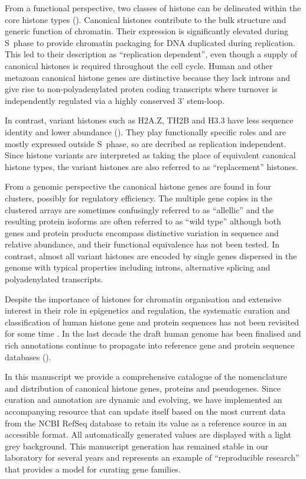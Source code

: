   From a functional perspective, two classes of histone can be delineated 
  within the core histone types (). 
  Canonical histones contribute to the bulk structure and generic function of chromatin. 
  Their expression is significantly elevated during S~phase to provide chromatin packaging 
  for DNA duplicated during replication. This led to their description as ``replication dependent'', 
  even though a supply of canonical histones is required throughout the cell cycle. 
  Human and other metazoan canonical histone genes are distinctive 
  because they lack introns and give rise to non-polyadenylated proten coding transcripts 
  where turnover is independently regulated via a highly conserved 3' stem-loop.
  
  In contrast, variant histones such as H2A.Z, TH2B and H3.3 have 
  less sequence identity and lower abundance (). 
  They play functionally specific roles and are mostly expressed outside S~phase, 
  so are decribed as replication independent. 
  Since histone variants are interpreted as taking the place of equivalent canonical histone types, 
  the variant histones are also referred to as ``replacement'' histones.
  
  From a genomic perspective the canonical histone genes are found in four clusters, possibly for regulatory efficiency. 
  The multiple gene copies in the clustered arrays are sometimes confusingly referred to as ``allellic'' 
  and the resulting protein isoforms are often referred to as ``wild type'' 
  although both genes and protein products encompass distinctive variation in sequence and relative abundance, 
  and their functional equivalence has not been tested.
  In contrast, almost all variant histones are encoded by single genes dispersed in the genome 
  with typical properties including introns, alternative splicing and polyadenylated transcripts.
  
  Despite the importance of histones for chromatin organisation and extensive interest
  in their role in epigenetics and regulation, the systematic curation and classification of human histone
  gene and protein sequences has not been revisited for some time \citep{Marzluff02}.
  In the last decade the draft human genome has been finalised 
  and rich annotations continue to propagate into reference gene and protein sequence databases ().

  In this manuscript we provide a comprehensive catalogue of the nomenclature and distribution 
  of canonical histone genes, proteins and pseudogenes. 
  Since curation and annotation are dynamic and evolving, we have implemented an accompanying resource 
  that can update itself based on the most current data from the NCBI RefSeq database 
  to retain its value as a reference source in an accessible format.
  All automatically generated values are displayed with a light grey background.
  This manuscript generation has remained stable in our laboratory for several years
  and represents an example of ``reproducible research'' 
  that provides a model for curating gene families.


